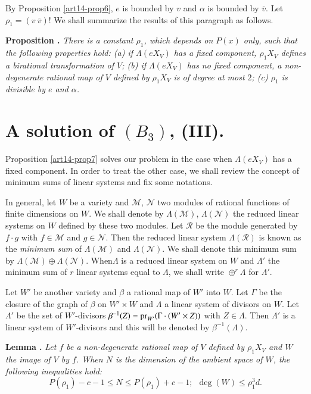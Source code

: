 By Proposition \ref{art14-prop6}, $e$ is bounded by $v$ and $\alpha$ is bounded by $\overline{v}$. Let $\rho_{1}=(v \ \overline{v})$! We shall summarize the results of this paragraph as follows.

\medskip
\noindent
{\bf Proposition .\label{art14-prop7}}
{\em There is a constant $\rho_{1}$, which depends on $P(x)$ only, such that the following properties hold: {\rm(a)} if $\Lambda(eX_{V})$ has a fixed component, $\rho_{1}X_{V}$ defines a birational transformation of $V$; {\rm(b)} if $\Lambda(eX_{V})$ has no fixed component, a non-degenerate rational map of $V$ defined by $\rho_{1}X_{V}$ is of degree at most $2$; {\rm(c)} $\rho_{1}$ is divisible by $e$ and $\alpha$.}

\section{A solution of \texorpdfstring{$(B_{3})$}{B3}, (III).}\label{art14-sec7}

Proposition \ref{art14-prop7} solves our problem in the case when $\Lambda(eX_{V})$ has a fixed component. In order to treat the other case, we shall review the concept of minimum sums of linear systems and fix some notations.

In general, let $W$ be a variety and $\mathscr{M}$, $\mathscr{N}$ two modules of rational functions of finite dimensions on $W$. We shall denote by $\Lambda(\mathscr{M})$, $\Lambda(\mathscr{N})$ the reduced linear systems on $W$ defined by these two modules. Let $\mathscr{R}$ be the module generated by $f\cdot g$ with $f\in \mathscr{M}$ and $g\in \mathscr{N}$. Then the reduced linear system $\Lambda(\mathscr{R})$ is known as the {\em minimum sum} of $\Lambda(\mathscr{M})$ and $\Lambda(\mathscr{N})$. We shall denote this minimum sum by $\Lambda(\mathscr{M})\oplus \Lambda(\mathscr{N})$. When\pageoriginale $\Lambda$ is a reduced linear system on $W$ and $\Lambda'$ the minimum sum of $r$ linear systems equal to $\Lambda$, we shall write $\oplus^{r}\Lambda$ for $\Lambda'$.

Let $W'$ be another variety and $\beta$ a rational map of $W'$ into $W$. Let $\Gamma$ be the closure of the graph of $\beta$ on $W'\times W$ and $\Lambda$ a linear system of divisors on $W$. Let $\Lambda'$ be the set of $W'$-divisors $\beta^{-1}(Z)=\operatorname{\mathrm{pr}}_{W'}(\Gamma\cdot (W'\times Z))$ with $Z\in \Lambda$. Then $\Lambda'$ is a linear system of $W'$-divisors and this will be denoted by $\beta^{-1}(\Lambda)$.

\medskip
\noindent
{\bf Lemma .\label{art14-lem8}}
{\em Let $f$ be a non-degenerate rational map of $V$ defined by $\rho_{1}X_{V}$ and $W$ the image of $V$ by $f$. When $N$ is the dimension of the ambient space of $W$, the following inequalities hold:}
$$
P(\rho_{1})-c-1\leq N\leq P(\rho_{1})+c-1; \ \ \deg(W)\leq \rho^{3}_{1}d.
$$

